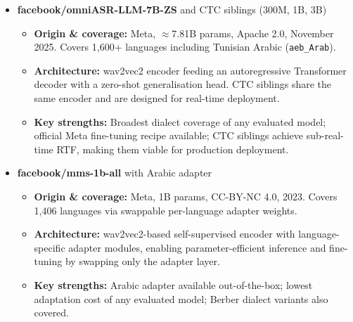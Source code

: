 \documentclass[12pt,a4paper]{report}
\begin{document}
\begin{itemize}



  \item \textbf{facebook/omniASR-LLM-7B-ZS} and CTC siblings (300M, 1B, 3B)
  \begin{itemize}
    \item \textbf{Origin \& coverage:} Meta, $\approx$7.81B params, Apache 2.0, November 2025.
    Covers 1,600+ languages including Tunisian Arabic (\texttt{aeb\_Arab}).
    \item \textbf{Architecture:} wav2vec2 encoder feeding an autoregressive Transformer decoder
    with a zero-shot generalisation head. CTC siblings share the same encoder and are designed
    for real-time deployment.
    \item \textbf{Key strengths:} Broadest dialect coverage of any evaluated model; official Meta
    fine-tuning recipe available; CTC siblings achieve sub-real-time RTF, making them viable
    for production deployment.
  \end{itemize}

  \item \textbf{facebook/mms-1b-all} with Arabic adapter
  \begin{itemize}
    \item \textbf{Origin \& coverage:} Meta, 1B params, CC-BY-NC 4.0, 2023.
    Covers 1,406 languages via swappable per-language adapter weights.
    \item \textbf{Architecture:} wav2vec2-based self-supervised encoder with language-specific
    adapter modules, enabling parameter-efficient inference and fine-tuning by swapping
    only the adapter layer.
    \item \textbf{Key strengths:} Arabic adapter available out-of-the-box; lowest adaptation
    cost of any evaluated model; Berber dialect variants also covered.
  \end{itemize}


\end{itemize}
\end{document}
